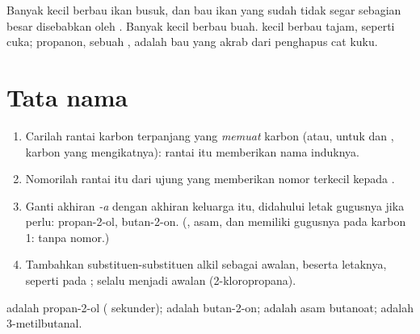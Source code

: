 \begin{remark}\label{rem:g11:functional-groups:smells}
Banyak  kecil berbau ikan busuk, dan bau ikan yang sudah tidak
segar sebagian besar disebabkan oleh . Banyak  kecil berbau
buah.  kecil berbau tajam, seperti cuka; propanon,
sebuah , adalah bau  yang akrab dari penghapus cat kuku.
\end{remark}

\section{Tata nama}

\begin{method}\label{met:g11:functional-groups:naming}
\begin{enumerate}
  \item Carilah rantai karbon terpanjang yang \emph{memuat} karbon  (atau, untuk  dan , karbon yang
        mengikatnya): rantai itu memberikan nama induknya.
  \item Nomorilah rantai itu dari ujung yang memberikan nomor terkecil
        kepada .
  \item Ganti akhiran \emph{-a}  dengan akhiran keluarga itu,
        didahului letak gugusnya jika perlu: propan-2-ol, butan-2-on.
        (, asam, dan  memiliki gugusnya pada karbon 1:
        tanpa nomor.)
  \item Tambahkan substituen-substituen alkil sebagai awalan, beserta
        letaknya, seperti pada ;  selalu menjadi awalan
        (2-kloropropana).
\end{enumerate}
\end{method}

\begin{example}\label{ex:g11:functional-groups:names}
 adalah propan-2-ol ( sekunder);
 adalah butan-2-on;
 adalah asam butanoat;
 adalah 3-metilbutanal.
\end{example}

